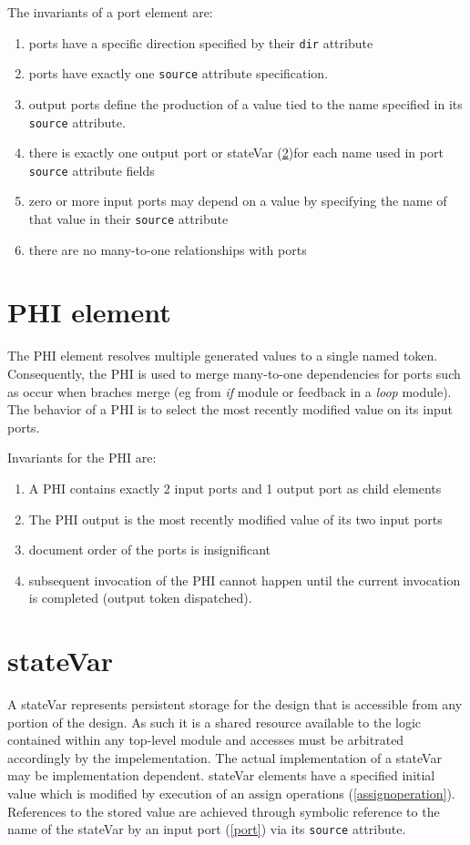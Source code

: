 The invariants of a port element are:\\
\begin{enumerate}
\item ports have a specific direction specified by their {\tt dir} attribute
\item ports have exactly one {\tt source} attribute specification.
\item output ports define the production of a value tied to the name specified in its {\tt source} attribute.
\item there is exactly one output port or stateVar (\ref{statevar})for each name used in port {\tt source} attribute fields
\item zero or more input ports may depend on a value by specifying the name of that value in their {\tt source} attribute
\item there are no many-to-one relationships with ports
\end{enumerate}

\section{PHI element}
The PHI element resolves multiple generated values to a single named token.  Consequently, the PHI is used to merge many-to-one dependencies for ports such as occur when braches merge (eg from {\it if} module or feedback in a {\it loop} module).  The behavior of a PHI is to select the most recently modified value on its input ports.  

Invariants for the PHI are:\\
\begin{enumerate}
\item A PHI contains exactly 2 input ports and 1 output port as child elements
\item The PHI output is the most recently modified value of its two input ports
\item document order of the ports is insignificant
\item subsequent invocation of the PHI cannot happen until the current invocation is completed (output token dispatched).
\end{enumerate}

\section{stateVar}\label{statevar}
A stateVar represents persistent storage for the design that is accessible from any portion of the design.  As such it is a shared resource available to the logic contained within any top-level module and accesses must be arbitrated accordingly by the impelementation.  The actual implementation of a stateVar may be implementation dependent.  stateVar elements have a specified initial value which is modified by execution of an assign operations (\ref{assignoperation}).  References to the stored value are achieved through symbolic reference to the name of the stateVar by an input port (\ref{port}) via its {\tt source} attribute.

